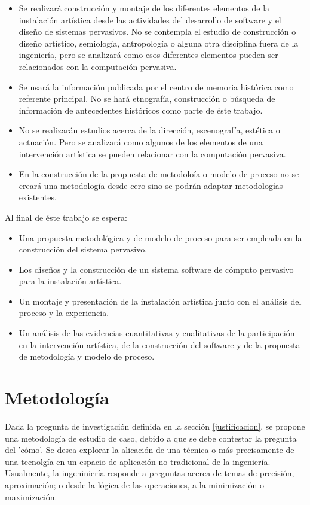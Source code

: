 \begin{itemize}
    \item Se realizará construcción y montaje de los diferentes elementos de la instalación artística desde las actividades del desarrollo de software y el diseño de sistemas pervasivos. No se contempla el estudio de construcción o diseño artístico, semiología, antropología o alguna otra disciplina fuera de la ingeniería, pero se analizará como esos diferentes elementos pueden ser relacionados con la computación pervasiva.
    \item Se usará la información publicada por el centro de memoria histórica como referente principal. No se hará etnografía, construcción o búsqueda de información de antecedentes históricos como parte de éste trabajo.
    \item No se realizarán estudios acerca de la dirección, escenografía, estética o actuación. Pero se analizará como algunos de los elementos de una intervención artística se pueden relacionar con la computación pervasiva.
    \item En la construcción de la propuesta de metodoloía o modelo de proceso no se creará una metodología desde cero sino se podrán adaptar metodologías existentes.
\end{itemize}

Al final de éste trabajo se espera:

\begin{itemize}
\item Una propuesta metodológica y de modelo de proceso para ser empleada en la construcción del sistema pervasivo.
\item Los diseños y la construcción de un sistema software de cómputo pervasivo para la instalación artística.
\item Un montaje y presentación de la instalación artística junto con el análisis del proceso y la experiencia.
\item Un análisis de las evidencias cuantitativas y cualitativas de la participación en la intervención artística, de la construcción del software y de la propuesta de metodología y modelo de proceso.

\end{itemize}

\section{Metodología}

Dada la pregunta de investigación definida en la sección \ref{justificacion}, se propone una metodología de estudio de caso\cite{robertkyin}, debido a que se debe contestar la pregunta del 'cómo'. Se desea explorar la alicación de una técnica o más precisamente de una tecnolgía en un espacio de aplicación no tradicional de la ingeniería. Usualmente, la ingeniniería responde a preguntas acerca de temas de precisión, aproximación; o desde la lógica de las operaciones, a la minimización o maximización.

